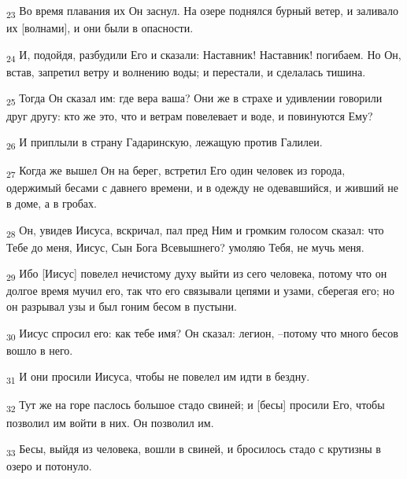 \begin{tcolorbox}
\textsubscript{23} Во время плавания их Он заснул. На озере поднялся бурный ветер, и заливало их [волнами], и они были в опасности.
\end{tcolorbox}
\begin{tcolorbox}
\textsubscript{24} И, подойдя, разбудили Его и сказали: Наставник! Наставник! погибаем. Но Он, встав, запретил ветру и волнению воды; и перестали, и сделалась тишина.
\end{tcolorbox}
\begin{tcolorbox}
\textsubscript{25} Тогда Он сказал им: где вера ваша? Они же в страхе и удивлении говорили друг другу: кто же это, что и ветрам повелевает и воде, и повинуются Ему?
\end{tcolorbox}
\begin{tcolorbox}
\textsubscript{26} И приплыли в страну Гадаринскую, лежащую против Галилеи.
\end{tcolorbox}
\begin{tcolorbox}
\textsubscript{27} Когда же вышел Он на берег, встретил Его один человек из города, одержимый бесами с давнего времени, и в одежду не одевавшийся, и живший не в доме, а в гробах.
\end{tcolorbox}
\begin{tcolorbox}
\textsubscript{28} Он, увидев Иисуса, вскричал, пал пред Ним и громким голосом сказал: что Тебе до меня, Иисус, Сын Бога Всевышнего? умоляю Тебя, не мучь меня.
\end{tcolorbox}
\begin{tcolorbox}
\textsubscript{29} Ибо [Иисус] повелел нечистому духу выйти из сего человека, потому что он долгое время мучил его, так что его связывали цепями и узами, сберегая его; но он разрывал узы и был гоним бесом в пустыни.
\end{tcolorbox}
\begin{tcolorbox}
\textsubscript{30} Иисус спросил его: как тебе имя? Он сказал: легион, --потому что много бесов вошло в него.
\end{tcolorbox}
\begin{tcolorbox}
\textsubscript{31} И они просили Иисуса, чтобы не повелел им идти в бездну.
\end{tcolorbox}
\begin{tcolorbox}
\textsubscript{32} Тут же на горе паслось большое стадо свиней; и [бесы] просили Его, чтобы позволил им войти в них. Он позволил им.
\end{tcolorbox}
\begin{tcolorbox}
\textsubscript{33} Бесы, выйдя из человека, вошли в свиней, и бросилось стадо с крутизны в озеро и потонуло.
\end{tcolorbox}
